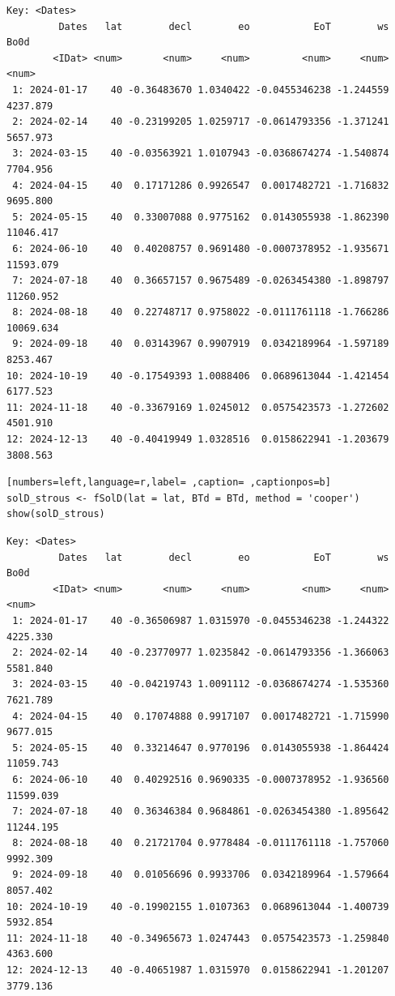 \begin{verbatim}
Key: <Dates>
         Dates   lat        decl        eo           EoT        ws      Bo0d
        <IDat> <num>       <num>     <num>         <num>     <num>     <num>
 1: 2024-01-17    40 -0.36483670 1.0340422 -0.0455346238 -1.244559  4237.879
 2: 2024-02-14    40 -0.23199205 1.0259717 -0.0614793356 -1.371241  5657.973
 3: 2024-03-15    40 -0.03563921 1.0107943 -0.0368674274 -1.540874  7704.956
 4: 2024-04-15    40  0.17171286 0.9926547  0.0017482721 -1.716832  9695.800
 5: 2024-05-15    40  0.33007088 0.9775162  0.0143055938 -1.862390 11046.417
 6: 2024-06-10    40  0.40208757 0.9691480 -0.0007378952 -1.935671 11593.079
 7: 2024-07-18    40  0.36657157 0.9675489 -0.0263454380 -1.898797 11260.952
 8: 2024-08-18    40  0.22748717 0.9758022 -0.0111761118 -1.766286 10069.634
 9: 2024-09-18    40  0.03143967 0.9907919  0.0342189964 -1.597189  8253.467
10: 2024-10-19    40 -0.17549393 1.0088406  0.0689613044 -1.421454  6177.523
11: 2024-11-18    40 -0.33679169 1.0245012  0.0575423573 -1.272602  4501.910
12: 2024-12-13    40 -0.40419949 1.0328516  0.0158622941 -1.203679  3808.563
\end{verbatim}

\begin{lstlisting}[numbers=left,language=r,label= ,caption= ,captionpos=b]
solD_strous <- fSolD(lat = lat, BTd = BTd, method = 'cooper')
show(solD_strous)
\end{lstlisting}

\begin{verbatim}
Key: <Dates>
         Dates   lat        decl        eo           EoT        ws      Bo0d
        <IDat> <num>       <num>     <num>         <num>     <num>     <num>
 1: 2024-01-17    40 -0.36506987 1.0315970 -0.0455346238 -1.244322  4225.330
 2: 2024-02-14    40 -0.23770977 1.0235842 -0.0614793356 -1.366063  5581.840
 3: 2024-03-15    40 -0.04219743 1.0091112 -0.0368674274 -1.535360  7621.789
 4: 2024-04-15    40  0.17074888 0.9917107  0.0017482721 -1.715990  9677.015
 5: 2024-05-15    40  0.33214647 0.9770196  0.0143055938 -1.864424 11059.743
 6: 2024-06-10    40  0.40292516 0.9690335 -0.0007378952 -1.936560 11599.039
 7: 2024-07-18    40  0.36346384 0.9684861 -0.0263454380 -1.895642 11244.195
 8: 2024-08-18    40  0.21721704 0.9778484 -0.0111761118 -1.757060  9992.309
 9: 2024-09-18    40  0.01056696 0.9933706  0.0342189964 -1.579664  8057.402
10: 2024-10-19    40 -0.19902155 1.0107363  0.0689613044 -1.400739  5932.854
11: 2024-11-18    40 -0.34965673 1.0247443  0.0575423573 -1.259840  4363.600
12: 2024-12-13    40 -0.40651987 1.0315970  0.0158622941 -1.201207  3779.136
\end{verbatim}

